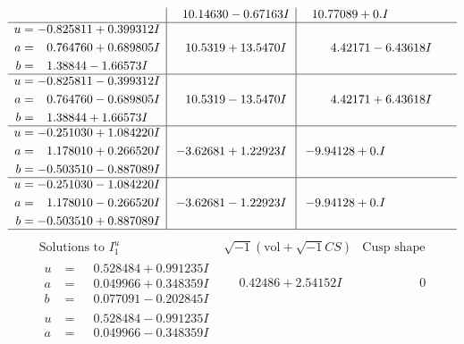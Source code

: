 \documentclass[1p]{elsarticle_modified}
\theoremstyle{definition}
\newcommand{\I}{\sqrt{-1}}
\begin{document}
$$\begin{array}{c|c|c}
 & \phantom{-}10.14630 - 0.67163 I & \phantom{-}10.77089 + 0. I\phantom{ +0.000000I} \\ \hline\begin{aligned}
u &= -0.825811 + 0.399312 I \\
a &= \phantom{-}0.764760 + 0.689805 I \\
b &= \phantom{-}1.38844 - 1.66573 I\end{aligned}
 & \phantom{-}10.5319 + 13.5470 I & \phantom{-}4.42171 - 6.43618 I \\ \hline\begin{aligned}
u &= -0.825811 - 0.399312 I \\
a &= \phantom{-}0.764760 - 0.689805 I \\
b &= \phantom{-}1.38844 + 1.66573 I\end{aligned}
 & \phantom{-}10.5319 - 13.5470 I & \phantom{-}4.42171 + 6.43618 I \\ \hline\begin{aligned}
u &= -0.251030 + 1.084220 I \\
a &= \phantom{-}1.178010 + 0.266520 I \\
b &= -0.503510 - 0.887089 I\end{aligned}
 & -3.62681 + 1.22923 I & -9.94128 + 0. I\phantom{ +0.000000I} \\ \hline\begin{aligned}
u &= -0.251030 - 1.084220 I \\
a &= \phantom{-}1.178010 - 0.266520 I \\
b &= -0.503510 + 0.887089 I\end{aligned}
 & -3.62681 - 1.22923 I & -9.94128 + 0. I\phantom{ +0.000000I}\\
 \hline 
 \end{array}$$\newpage$$\begin{array}{c|c|c}  
\text{Solutions to }I^u_{1}& \I (\text{vol} + \sqrt{-1}CS) & \text{Cusp shape}\\
 \hline 
\begin{aligned}
u &= \phantom{-}0.528484 + 0.991235 I \\
a &= \phantom{-}0.049966 + 0.348359 I \\
b &= \phantom{-}0.077091 - 0.202845 I\end{aligned}
 & \phantom{-}0.42486 + 2.54152 I & \phantom{-0.000000 } 0 \\ \hline\begin{aligned}
u &= \phantom{-}0.528484 - 0.991235 I \\
a &= \phantom{-}0.049966 - 0.348359 I \\

\end{aligned}
\end{array}$$
\end{document}

